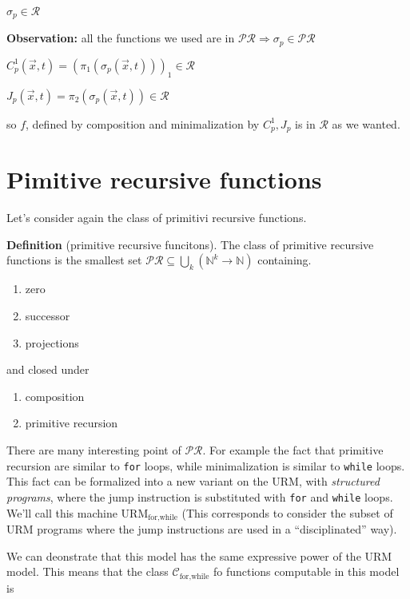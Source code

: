 \documentclass{amsbook}
\theoremstyle{definition}
\theoremstyle{remark}
\numberwithin{section}{chapter}
\numberwithin{equation}{chapter}
\begin{document}
$\sigma_p \in \mathcal{R}$

\textbf{Observation:} all the functions we used are in  $\mathcal{PR} \Rightarrow \sigma_p \in \mathcal{PR}$

$C_p^1(\vec{x}, t) = (\pi_1(\sigma_p(\vec{x}, t)))_1 \in \mathcal{R}$

$J_p(\vec{x}, t) = \pi_2(\sigma_p(\vec{x}, t)) \in \mathcal{R}$

so $f$, defined by composition and minimalization by $C_p^1, J_p$ is in $\mathcal{R}$ as we wanted.

\hfill \qedsymbol

\chapter{Pimitive recursive functions}
Let's consider again the class of primitivi recursive functions.

\textbf{Definition} (primitive recursive funcitons).  The class of
primitive recursive functions is the smallest set
$\mathcal{PR} \subseteq \bigcup\limits_k(\mathbb{N}^k \rightarrow
\mathbb{N})$ containing.

\begin{enumerate}[label=(\alph*)]
\item zero
\item successor
\item projections
\end{enumerate}

and closed under

\begin{enumerate}[label=(\arabic*)]
\item composition
\item primitive recursion
\end{enumerate}

There are many interesting point of $\mathcal{PR}$. For example the
fact that primitive recursion are similar to \texttt{for} loops, while
minimalization is similar to \texttt{while} loops. This fact can be
formalized into a new variant on the URM, with \textit{structured
  programs}, where the jump instruction is substituted with
\texttt{for} and \texttt{while} loops. We'll call this machine
$\text{URM}_{\text{for,while}}$ (This corresponds to consider the
subset of URM programs where the jump instructions are used in a
``disciplinated'' way).

We can deonstrate that this model has the same expressive power of the
URM model. This means that the class $\mathcal{C}_{\text{for,while}}$
fo functions computable in this model is
\end{document}
